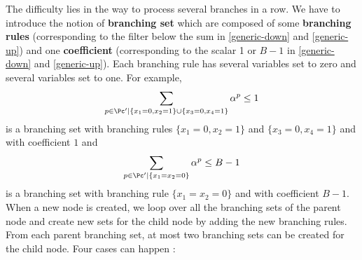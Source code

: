 The difficulty lies in the way to process several branches in a row. We have to introduce the notion of \textbf{branching set} which are composed of some \textbf{branching rules} (corresponding to the filter below the sum in \eqref{generic-down} and \eqref{generic-up}) and one \textbf{coefficient} (corresponding to the scalar 1 or $B-1$ in \eqref{generic-down} and \eqref{generic-up}). Each branching rule has several variables set to zero and several variables set to one. For example, 
\begin{equation*}
	\sum_{p \in \Pc' | \{x_1 = 0, x_2 = 1\} \cup \{x_3 = 0, x_4 = 1\}} \alpha^p \leq 1
\end{equation*}
is a branching set with branching rules $\{x_1 = 0, x_2 = 1\}$ and $\{x_3 = 0, x_4 = 1\}$ and with coefficient $1$ and 
\begin{equation*}
	\sum_{p \in \Pc' | \{x_1 = x_2 = 0\}} \alpha^p \leq B-1
\end{equation*}
is a branching set with branching rule $\{x_1 = x_2 = 0\}$ and with coefficient $B-1$. When a new node is created, we loop over all the branching sets of the parent node and create new sets for the child node by adding the new branching rules. From each parent branching set, at most two branching sets can be created for the child node. Four cases can happen : 

